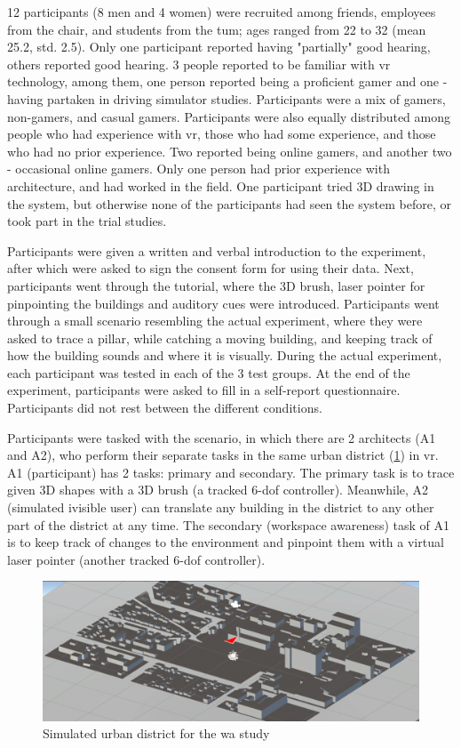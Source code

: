12 participants (8 men and 4 women) were recruited among friends, employees from the chair, and students from the \gls{tum}; ages ranged from 22 to 32 (mean 25.2, std. 2.5). Only one participant reported having "partially" good hearing, others reported good hearing. 3 people reported to be familiar with \gls{vr} technology, among them, one person reported being a proficient gamer and one - having partaken in driving simulator studies. Participants were a mix of gamers, non-gamers, and casual gamers. Participants were also equally distributed among people who had experience with \gls{vr}, those who had some experience, and those who had no prior experience. Two reported being online gamers, and another two - occasional online gamers. Only one person had prior experience with architecture, and had worked in the field. One participant tried 3D drawing in the system, but otherwise none of the participants had seen the system before, or took part in the trial studies.

Participants were given a written and verbal introduction to the experiment,
after which were asked to sign the consent form for using their data.
Next, participants went through the tutorial, where the 3D brush, laser pointer for pinpointing the buildings and auditory cues were introduced. Participants went through a small scenario resembling the actual experiment, where they were asked to trace a pillar, while catching a moving building, and keeping track of how the building sounds and where it is visually.
During the actual experiment, each participant was tested in each of the 3 test groups.
At the end of the experiment, participants were asked to fill in a self-report questionnaire.
Participants did not rest between the different conditions. 

Participants were tasked with the scenario, in which there are 2 architects (A1 and A2), who perform their separate tasks in the same urban district (\ref{fig:urbandistrict}) in \gls{vr}. A1 (participant) has 2 tasks: primary and secondary. The primary task is to trace given 3D shapes with a 3D brush (a tracked 6-\gls{dof} controller). Meanwhile, A2 (simulated ivisible user) can translate any building in the district to any other part of the district at any time. The secondary (workspace awareness) task of A1 is to keep track of changes to the environment and pinpoint them with a virtual laser pointer (another tracked 6-\gls{dof} controller).

\begin{figure}
	\centering
	\includegraphics[width=0.7\linewidth]{figures/urban_district}
	\caption{Simulated urban district for the \gls{wa} study}
	\label{fig:urbandistrict}
\end{figure}


